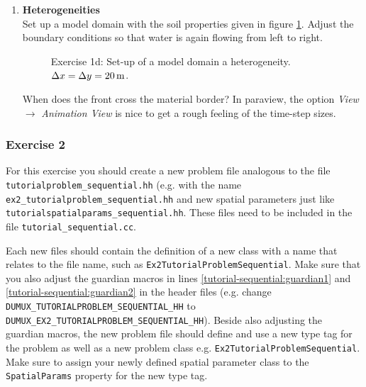 \begin{enumerate}
\item \textbf{Heterogeneities}  \\
Set up a model domain with the soil properties given in figure \ref{tutorial-deoucpled:exercise1_d}.
Adjust the boundary conditions so that water is again flowing from left to right.
\begin{figure}[bt]
\centering
{}
\caption{Exercise 1d: Set-up of a model domain a heterogeneity. $\Delta x = \Delta y = \unit[20]{m}$.}
\label{tutorial-deoucpled:exercise1_d}
\end{figure}
When does the front cross the material border? In paraview, the option
\textit{View} $\rightarrow$ \textit{Animation View} is nice to get a rough
feeling of the time-step sizes.
\end{enumerate}

\subsubsection{Exercise 2}
For this exercise you should create a new problem file analogous to
the file \texttt{tutorialproblem\_sequential.hh} (e.g. with the name
\texttt{ex2\_tutorialproblem\_sequential.hh} and new spatial parameters
just like \texttt{tutorial\-spatialparams\_sequential.hh}. These files need to
be included in the file \texttt{tutorial\_sequential.cc}.

Each new files should contain the definition of a new class with a
name that relates to the file name, such as \texttt{Ex2TutorialProblemSequential}.
Make sure that you also adjust the guardian
macros in lines \ref{tutorial-sequential:guardian1} and \ref{tutorial-sequential:guardian2}
 in the header files (e.g. change \\
\texttt{DUMUX\_TUTORIALPROBLEM\_SEQUENTIAL\_HH} to
\texttt{DUMUX\_EX2\_TUTORIALPROBLEM\_SEQUENTIAL\_HH}).  Beside also adjusting the guardian macros,
the new problem file should define and use a new type tag for the problem as well as a new problem class
e.g. \texttt{Ex2TutorialProblemSequential}. Make sure to assign your newly defined spatial
parameter class to the \texttt{SpatialParams} property for the new
type tag.

